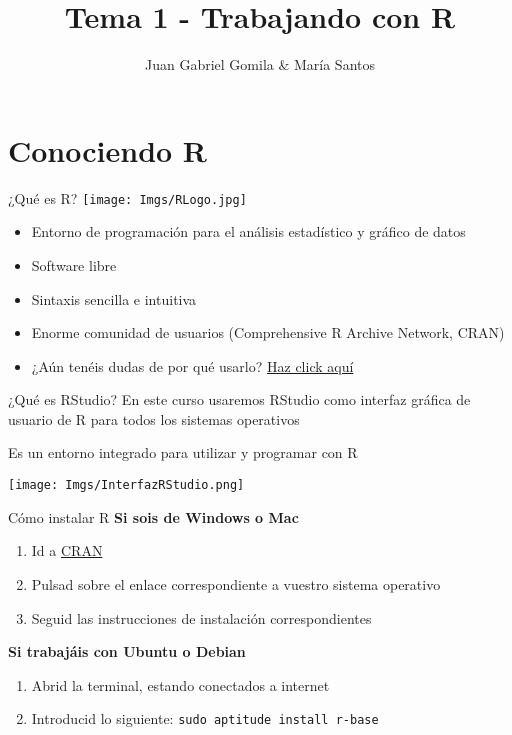 \documentclass[
  ignorenonframetext,
]{beamer}
\title{Tema 1 - Trabajando con R}
\author{Juan Gabriel Gomila \& María Santos}
\date{}
\providecommand{\tightlist}{%
  \setlength{\itemsep}{0pt}\setlength{\parskip}{0pt}}
\begin{document}
\frame{\titlepage}

\hypertarget{conociendo-r}{%
\section{Conociendo R}\label{conociendo-r}}

\begin{frame}{¿Qué es R?}
\protect\hypertarget{quuxe9-es-r}{}
\texttt{[image: Imgs/RLogo.jpg]}

\begin{itemize}
\tightlist
\item
  Entorno de programación para el análisis estadístico y gráfico de
  datos
\item
  Software libre
\item
  Sintaxis sencilla e intuitiva
\item
  Enorme comunidad de usuarios (Comprehensive R Archive Network, CRAN)
\item
  ¿Aún tenéis dudas de por qué usarlo?
  \href{https://www.r-bloggers.com/why-use-r-five-reasons/}{Haz click
  aquí}
\end{itemize}
\end{frame}

\begin{frame}{¿Qué es RStudio?}
\protect\hypertarget{quuxe9-es-rstudio}{}
En este curso usaremos RStudio como interfaz gráfica de usuario de R
para todos los sistemas operativos

Es un entorno integrado para utilizar y programar con R

\texttt{[image: Imgs/InterfazRStudio.png]}
\end{frame}

\begin{frame}[fragile]{Cómo instalar R}
\protect\hypertarget{cuxf3mo-instalar-r}{}
\textbf{Si sois de Windows o Mac}

\begin{enumerate}
\tightlist
\item
  Id a \href{http://cran.r-project.org/}{CRAN}
\item
  Pulsad sobre el enlace correspondiente a vuestro sistema operativo
\item
  Seguid las instrucciones de instalación correspondientes
\end{enumerate}

\textbf{Si trabajáis con Ubuntu o Debian}

\begin{enumerate}
\tightlist
\item
  Abrid la terminal, estando conectados a internet
\item
  Introducid lo siguiente: \texttt{sudo\ aptitude\ install\ r-base}
\end{enumerate}
\end{frame}
\end{document}
